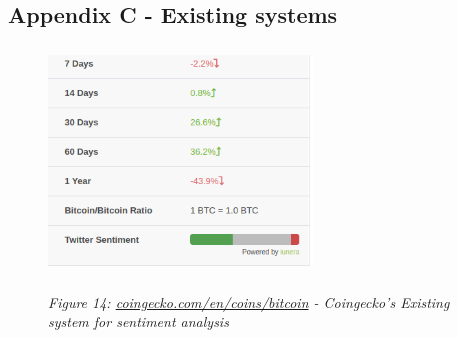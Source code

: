 \documentclass[oneside, 12pt]{article}
\begin{document}
	\newpage
	
	\subsection{Appendix C - Existing systems}
		\begin{figure}[hbt!]
			\centering
			\includegraphics[width=7cm,height=6cm]{images/existing_system.png}
			\begin{center}
				\textit{Figure 14: \url{coingecko.com/en/coins/bitcoin} - Coingecko's Existing system for sentiment analysis}
			\end{center}
		\end{figure}
\end{document}
